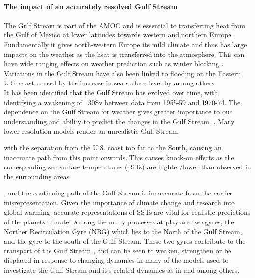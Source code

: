 \documentclass[..\EOYR.tex]{subfiles}
\begin{document}
\paragraph{The impact of an accurately resolved Gulf Stream}
The Gulf Stream is part of the AMOC and is essential to transferring heat from the Gulf of Mexico at lower latitudes towards western and northern Europe. Fundamentally it gives north-western Europe its mild climate and thus has large impacts on the weather as the heat is transferred into the atmosphere.
This can have wide ranging effects on weather prediction such as winter blocking \citep{Scaife2011a}  . Variations in the Gulf Stream have also been linked to flooding on the Eastern U.S. coast caused by the increase in sea surface level by \citep{Ezer2015} among others. \\
It has been identified that the Gulf Stream has evolved over time, with \citep{Greatbatch1991} identifying a weakening of ~30Sv between data from 1955-59 and 1970-74.  The dependence on the Gulf Stream for weather gives greater importance to our understanding and ability to predict the changes in the Gulf Stream. .
Many lower resolution models render an unrealistic Gulf Stream, with the separation from the U.S. coast too far to the South, causing an inaccurate path from this point onwards.
This causes knock-on effects as the corresponding sea surface temperatures (SSTs) are highter/lower than observed in the surrounding areas \citep{Greatbatch2004}, and the continuing path of the Gulf Stream is innaccurate from the earlier misrepresentation.
Given the importance of climate change and research into global warming, accurate representations of SSTs are vital for realistic predictions of the planets climate.
Among the many processes at play are two gyres, the  Norther Recirculation Gyre (NRG) which lies to the North of the Gulf Stream, and the   gyre to the south of the Gulf Stream. These two gyres contribute to the transport of the Gulf Stream \citep{Hogg1986}, and can be seen to weaken, strengthen or be displaced in response to changing dynamics in many of the models used to investigate the Gulf Stream and it's related dynamics as in  \citep{Greatbatch1991} and \citep{Zhang2007} among others.
\end{document}
